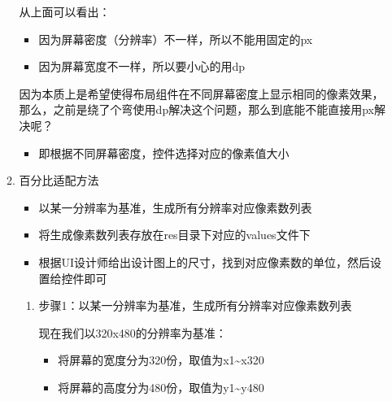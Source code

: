 \documentclass[9pt, b5paper]{article}
\begin{document}
\begin{enumerate}
\begin{enumerate}
从上面可以看出：
\begin{itemize}
\item 因为屏幕密度（分辨率）不一样，所以不能用固定的px
\item 因为屏幕宽度不一样，所以要小心的用dp
\end{itemize}

因为本质上是希望使得布局组件在不同屏幕密度上显示相同的像素效果，那么，之前是绕了个弯使用dp解决这个问题，那么到底能不能直接用px解决呢？
\begin{itemize}
\item 即根据不同屏幕密度，控件选择对应的像素值大小
\end{itemize}

\item 百分比适配方法
\label{sec-6-6-2-1-2}
\begin{itemize}
\item 以某一分辨率为基准，生成所有分辨率对应像素数列表
\item 将生成像素数列表存放在res目录下对应的values文件下
\item 根据UI设计师给出设计图上的尺寸，找到对应像素数的单位，然后设置给控件即可
\end{itemize}

\begin{enumerate}
\item 步骤1：以某一分辨率为基准，生成所有分辨率对应像素数列表
\label{sec-6-6-2-1-2-1}

现在我们以320x480的分辨率为基准：
\begin{itemize}
\item 将屏幕的宽度分为320份，取值为x1\textasciitilde{}x320
\item 将屏幕的高度分为480份，取值为y1\textasciitilde{}y480
\end{itemize}


\end{enumerate}
\end{enumerate}
\end{enumerate}
\end{document}
